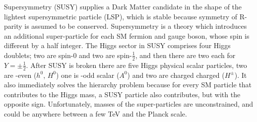 %











Supersymmetry (SUSY)
supplies a Dark Matter candidate in the shape of the lightest supersymmetric
particle (LSP),
which is stable because symmetry of R-parity is assumed to be conserved.
Supersymmetry is a theory which introduces an additional super-particle for each SM fermion and
gauge boson, whose spin is different by a half integer.
The Higgs sector in SUSY comprises four Higgs doublets; two are spin-0 and two are spin-$\tfrac12$,
and then there are two each for $Y=\pm\tfrac12$.
After SUSY is broken there are five Higgs physical scalar particles, two are \CP-even ($h^0$,
$H^0$) one is \CP-odd scalar ($A^0$) and two are charged charged ($H^\pm$).
It also immediately solves the hierarchy problem because for every SM particle that contributes to
the Higgs mass, a SUSY particle also contributes, but with the opposite sign.
Unfortunately, masses of the super-particles are unconstrained, and could be anywhere between a few
TeV and the Planck scale.

